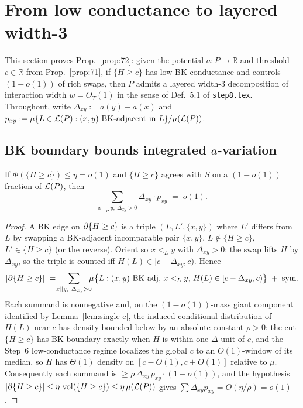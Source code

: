 \section{From low conductance to layered width-3}\label{sec:layered}

This section proves Prop.~\ref{prop:72}: given the potential
$a\colon P\to\mathbb{R}$ and threshold $c\in\mathbb{R}$ from
Prop.~\ref{prop:71}, if $\{H\ge c\}$ has low BK conductance and
controls $(1-o(1))$ of rich swaps, then $P$ admits a layered
width-$3$ decomposition of interaction width $w=O_T(1)$ in the sense
of Def.~5.1 of \texttt{step8.tex}.
Throughout, write $\Delta_{xy}:=a(y)-a(x)$ and
$p_{xy}:=\mu\{L\in\mathcal{L}(P):(x,y)\text{ BK-adjacent in }L\}/\mu(\mathcal{L}(P))$.

\subsection{BK boundary bounds integrated $a$-variation}

\begin{lemma}\label{lem:budget-var}
If $\Phi(\{H\ge c\})\le\eta=o(1)$ and $\{H\ge c\}$ agrees with $S$ on
a $(1-o(1))$ fraction of $\mathcal{L}(P)$, then
\begin{equation}\label{eq:var-budget}
  \sum_{x\parallel_P y,\ \Delta_{xy}>0}\Delta_{xy}\cdot p_{xy}
  \;=\; o(1).
\end{equation}
\end{lemma}

\begin{proof}
A BK edge on $\partial\{H\ge c\}$ is a triple $(L,L',\{x,y\})$ where $L'$
differs from $L$ by swapping a BK-adjacent incomparable pair
$\{x,y\}$, $L\notin\{H\ge c\}$, $L'\in\{H\ge c\}$ (or the reverse).
Orient so $x<_Ly$ with $\Delta_{xy}>0$: the swap lifts $H$ by
$\Delta_{xy}$, so the triple is counted iff
$H(L)\in[c-\Delta_{xy},c)$.  Hence
\[
  |\partial\{H\ge c\}|
  \;=\;\!\!\!\sum_{x\parallel y,\ \Delta_{xy}>0}\!\!\!
  \mu\bigl\{L:(x,y)\text{ BK-adj},\,x<_Ly,\,H(L)\in[c-\Delta_{xy},c)\bigr\}
  \;+\;\text{sym}.
\]
Each summand is nonnegative and, on the $(1-o(1))$-mass giant
component identified by Lemma~\ref{lem:single-c}, the induced
conditional distribution of $H(L)$ near $c$ has density bounded below
by an absolute constant $\rho>0$: the cut $\{H\ge c\}$ has BK
boundary exactly when $H$ is within one $\Delta$-unit of $c$, and the
Step~6 low-conductance regime localizes the global $c$ to an
$O(1)$-window of its median, so $H$ has $\Theta(1)$ density on
$[c-O(1),c+O(1)]$ relative to $\mu$.  Consequently each summand is
$\ge\rho\,\Delta_{xy}\,p_{xy}\cdot(1-o(1))$, and the hypothesis
$|\partial\{H\ge c\}|\le\eta\,\operatorname{vol}(\{H\ge c\})\le\eta\,\mu(\mathcal{L}(P))$ gives
$\sum\Delta_{xy}p_{xy}=O(\eta/\rho)=o(1)$.
\end{proof}

